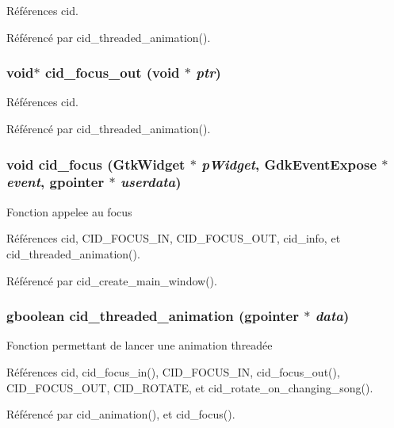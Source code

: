 Références cid.

Référencé par cid\_\-threaded\_\-animation().
\subsubsection{\setlength{\rightskip}{0pt plus 5cm}void$\ast$ cid\_\-focus\_\-out (void $\ast$ {\em ptr})}\label{cid-main_8c_4c356ae24a573f4fca47036dccc87e92}




Références cid.

Référencé par cid\_\-threaded\_\-animation().
\subsubsection{\setlength{\rightskip}{0pt plus 5cm}void cid\_\-focus (GtkWidget $\ast$ {\em pWidget}, \/  GdkEventExpose $\ast$ {\em event}, \/  gpointer $\ast$ {\em userdata})}\label{cid-main_8c_53b806a2d95d2c3f4a4e998b2ab0f4f2}


Fonction appelee au focus 

Références cid, CID\_\-FOCUS\_\-IN, CID\_\-FOCUS\_\-OUT, cid\_\-info, et cid\_\-threaded\_\-animation().

Référencé par cid\_\-create\_\-main\_\-window().
\subsubsection{\setlength{\rightskip}{0pt plus 5cm}gboolean cid\_\-threaded\_\-animation (gpointer $\ast$ {\em data})}\label{cid-main_8c_388cbc7682b3b0da4860795ccdb70111}


Fonction permettant de lancer une animation threadée 

Références cid, cid\_\-focus\_\-in(), CID\_\-FOCUS\_\-IN, cid\_\-focus\_\-out(), CID\_\-FOCUS\_\-OUT, CID\_\-ROTATE, et cid\_\-rotate\_\-on\_\-changing\_\-song().

Référencé par cid\_\-animation(), et cid\_\-focus().
